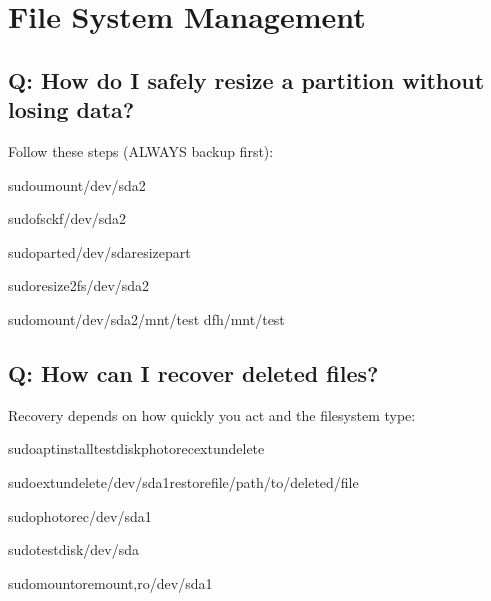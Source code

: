 \documentclass[letterpaper,10pt,english]{sphinxmanual}
\begin{document}
\section{File System Management}
\label{\detokenize{faq:file-system-management}}

\subsection{Q: How do I safely resize a partition without losing data?}
\label{\detokenize{faq:q-how-do-i-safely-resize-a-partition-without-losing-data}}
\sphinxAtStartPar
{} Follow these steps (ALWAYS backup first):

\begin{sphinxVerbatim}[commandchars=\\\{\}]

sudoumount/dev/sda2

sudofsck\PYGZhy{}f/dev/sda2

sudoparted/dev/sdaresizepart\PYGZpc{}

sudoresize2fs/dev/sda2

sudomount/dev/sda2/mnt/test
df\PYGZhy{}h/mnt/test
\end{sphinxVerbatim}


\subsection{Q: How can I recover deleted files?}
\label{\detokenize{faq:q-how-can-i-recover-deleted-files}}
\sphinxAtStartPar
{} Recovery depends on how quickly you act and the filesystem type:

\begin{sphinxVerbatim}[commandchars=\\\{\}]
sudoaptinstalltestdiskphotorecextundelete

sudoextundelete/dev/sda1\PYGZhy{}\PYGZhy{}restore\PYGZhy{}file/path/to/deleted/file

sudophotorec/dev/sda1

sudotestdisk/dev/sda

sudomount\PYGZhy{}oremount,ro/dev/sda1
\end{sphinxVerbatim}
\end{document}
